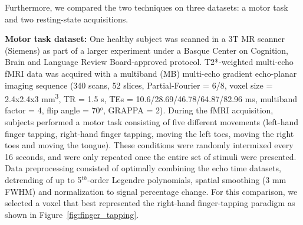 Furthermore, we compared the two techniques on three datasets: a motor task and two resting-state acquisitions.

\textbf{Motor task dataset:} One healthy subject was scanned in a 3T MR scanner (Siemens) as part of a larger experiment under a Basque Center on Cognition, Brain and Language Review Board-approved protocol. T2*-weighted multi-echo fMRI data was acquired with a multiband (MB) multi-echo gradient echo-planar imaging sequence (340 scans, 52 slices, Partial-Fourier = 6/8, voxel size = 2.4x2.4x3 mm\textsuperscript{3}, TR = 1.5 s, TEs = 10.6/28.69/46.78/64.87/82.96 ms, multiband factor = 4, flip angle = 70\(^o\), GRAPPA = 2). During the fMRI acquisition, subjects performed a motor task consisting of five different movements (left-hand finger tapping, right-hand finger tapping, moving the left toes, moving the right toes and moving the tongue). These conditions were randomly intermixed every 16 seconds, and were only repeated once the entire set of stimuli were presented. Data preprocessing consisted of optimally combining the echo time datasets, detrending of up to 5\(^{th}\)-order Legendre polynomials, spatial smoothing (3 mm FWHM) and normalization to signal percentage change. For this comparison, we selected a voxel that best represented the right-hand finger-tapping paradigm as shown in Figure~\ref{fig:finger_tapping}.

